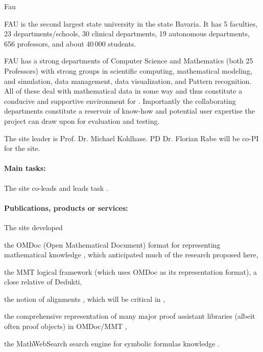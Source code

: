 \begin{sitedescription}{Fau}

  
FAU is the second largest state university in the state Bavaria.
It has 5 faculties, 23 departments/schools, 30 clinical departments, 19 autonomous departments, 656 professors, and about 40\,000 students.

FAU has a strong departments of Computer Science and Mathematics (both 25 Professors) with strong groups in scientific computing, mathematical modeling, and simulation, data management, data visualization, and Pattern recognition.
All of these deal with mathematical data in some way and thus constitute a conducive and supportive environment for \pn.
Importantly the collaborating departments constitute a reservoir of know-how and potential user expertise the \pn project can draw upon for evaluation and testing.

The site leader is Prof. Dr. Michael Kohlhase.
PD Dr. Florian Rabe will be co-PI for the site.

\paragraph*{Main tasks:}

The site co-leads  and leads task .

\paragraph*{Publications, products or services:}

The site developed 
\begin{compactitem}
 \item the OMDoc (Open Mathematical Document) format for representing mathematical knowledge \cite{Kohlhase:OMDoc1.2}, which anticipated much of the research proposed here,
 \item the MMT logical framework \cite{RabKoh:WSMSML13} (which uses OMDoc as its representation format), a close relative of Dedukti,
 \item the notion of alignments \cite{GKKMR:alignments:17}, which will be critical in ,
 \item the comprehensive representation of many major proof assistant libraries (albeit often proof objects) in OMDoc/MMT \cite{KR:oafexp:20},
 \item the MathWebSearch search engine for symbolic formulas knowledge \cite{ProKoh:mwssofse12}.
\end{compactitem}


\end{sitedescription}
